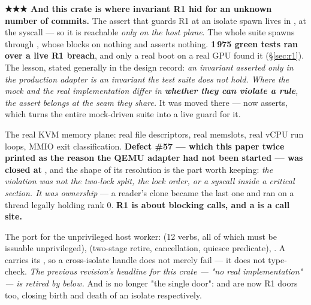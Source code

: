 \documentclass[10.5pt]{article}
\begin{document}
\begin{warnbox}\small
\textbf{★★★ And this crate is where invariant R1 hid for an unknown number of commits.} The
assert that guards R1 at an isolate spawn lives in , at the syscall — so
it is reachable \emph{only on the host plane}. The whole suite spawns through
, whose  blocks on nothing and asserts nothing.
\textbf{1\,975 green tests ran over a live R1 breach}, and only a real boot on a real GPU found
it (\S\ref{sec:r1}). The lesson, stated generally in the design record: \emph{an invariant
asserted only in the production adapter is an invariant the test suite does not hold. Where the
mock and the real implementation differ in \textbf{whether they can violate a rule}, the assert
belongs at the seam they share.} It was moved there —  now asserts, which
turns the entire mock-driven suite into a live guard for it.
\end{warnbox}

The real KVM memory plane: real  file descriptors, real memslots, real vCPU
run loops, MMIO exit classification. \textbf{Defect \#57 — which this paper twice printed as the
reason the QEMU adapter had not been started — was closed at }, and the shape of
its resolution is the part worth keeping: \emph{the violation was not the two-lock split, the
lock order, or a syscall inside a critical section. It was  ownership} — a reader's
clone became the last one and  ran on a thread legally holding rank 0.
\textbf{R1 is about blocking calls, and a  is a call site.}

The port for the unprivileged host worker:  (12 verbs, all of which must be
issuable unprivileged),  (two-stage retire, cancellation, quiesce predicate),
. A  carries its , so a cross-isolate
handle does not merely fail — it does not type-check. \emph{The previous revision's headline for
this crate — "no real implementation" — is retired by  below.} And
 is no longer "the single door":  and
 are now R1 doors too, closing birth and death of an isolate respectively.
\end{document}
